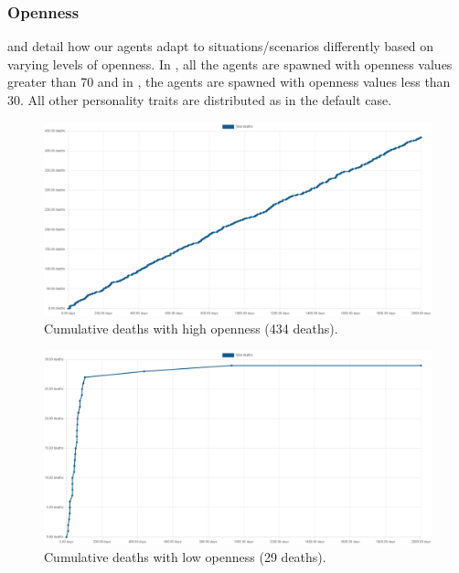 \subsubsection{Openness}
\label{subsubsec: Openness}

 and  detail how our agents adapt to situations/scenarios differently based on varying levels of openness. In , all the agents are spawned with openness values greater than 70 and in , the agents are spawned with openness values less than 30. All other personality traits are distributed as in the default case.

\begin{figure}[H]
    \begin{center}
        \includegraphics[scale=0.25]{009_team_7_agent_design/Images/Cumulative Deaths, With Treaties, T7Only, 2000days, 20food, High Openness, 434deaths.png}
    \end{center}
    \caption{Cumulative deaths with high openness (434 deaths).}
    \label{fig: High Openness}
\end{figure}

\begin{figure}[H]
    \begin{center}
        \includegraphics[scale=0.25]{009_team_7_agent_design/Images/Cumulative Deaths, With Treaties, T7Only, 2000days, 20food, Low Openness, 29deaths.png}
    \end{center}
    \caption{Cumulative deaths with low openness (29 deaths).}
    \label{fig: Low Openness}
\end{figure}

